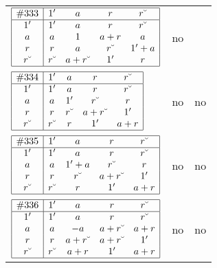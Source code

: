 \documentclass[12pt]{article}
\theoremstyle{definition}
\newcommand{\join}{\mathbin{+}}%
\newcommand{\con}[1]{#1\breve{\ }}
\newcommand{\id}{{1'}}%
\renewcommand{\top}{1}%
\begin{document}
\begin{center}
\begin{longtable}{l|c|c}
$
\begin{array}{|c|cccc|} \hline
\#333 & \id & a & r & \con{r} \\ \hline
\id & \id & a & r & \con{r} \\
a & a & \top & a \join r & a \\
r & r & a & \con{r} & \id \join a \\
\con{r} & \con{r} & a \join \con{r} & \id & r \\ \hline
\end{array}
$
 & no  
 & \adjustbox{valign=c, max height=1.6cm}{$
\left[ \begin{array}{cccccc}
\id & a & r & \con{r} & a & a \\ 
a & \id & a & a & a & r \\ 
\con{r} & a & \id & r & a & a \\ 
r & a & \con{r} & \id & a & a \\ 
a & a & a & a & \id & r \\ 
a & \con{r} & a & a & \con{r} & \id
\end{array}\right]
$}      \\[15mm]

$
\begin{array}{|c|cccc|} \hline
\#334 & \id & a & r & \con{r} \\ \hline
\id & \id & a & r & \con{r} \\
a & a & \id & \con{r} & r \\
r & r & \con{r} & a \join \con{r} & \id \\
\con{r} & \con{r} & r & \id & a \join r \\ \hline
\end{array}
$
 & no  
 & no       \\[15mm]

$
\begin{array}{|c|cccc|} \hline
\#335 & \id & a & r & \con{r} \\ \hline
\id & \id & a & r & \con{r} \\
a & a & \id \join a & \con{r} & r \\
r & r & \con{r} & a \join \con{r} & \id \\
\con{r} & \con{r} & r & \id & a \join r \\ \hline
\end{array}
$
 & no  
 & no       \\[15mm]

$
\begin{array}{|c|cccc|} \hline
\#336 & \id & a & r & \con{r} \\ \hline
\id & \id & a & r & \con{r} \\
a & a & -a & a \join \con{r} & a \join r \\
r & r & a \join \con{r} & a \join \con{r} & \id \\
\con{r} & \con{r} & a \join r & \id & a \join r \\ \hline
\end{array}
$
 & no  
 & no       \\[15mm]


\end{longtable}
\end{center}
\end{document}
